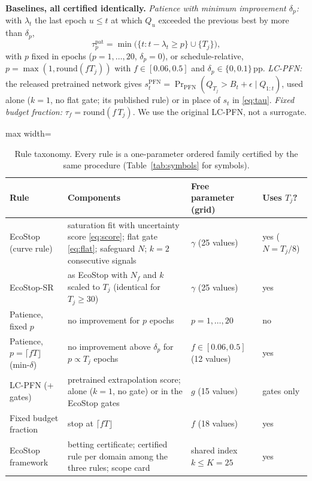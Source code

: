 \documentclass[3p,twocolumn,10pt]{elsarticle}
\theoremstyle{definition}
\begin{document}
\textbf{Baselines, all certified identically.} \emph{Patience with minimum improvement $\delta_p$:} with $\lambda_t$ the last epoch $u\le t$ at which $Q_u$ exceeded the previous best by more than $\delta_p$,
\begin{equation}
\tau^{\mathrm{pat}}_{p}=\min\big(\{t: t-\lambda_t\ge p\}\cup\{T_j\}\big),
\label{eq:pat}
\end{equation}
with $p$ fixed in epochs ($p=1,\dots,20$, $\delta_p=0$), or schedule-relative, $p=\max(1,\mathrm{round}(fT_j))$ with $f\in[0.06,0.5]$ and $\delta_p\in\{0,0.1\}$\,pp. \emph{LC-PFN:} the released pretrained network \citep{adriaensen2023lcpfn} gives $s^{\mathrm{PFN}}_t=\Pr_{\mathrm{PFN}}(Q_{T_j}>B_t+\epsilon\mid Q_{1:t})$, used alone ($k=1$, no flat gate; its published rule) or in place of $s_t$ in \eqref{eq:tau}. \emph{Fixed budget fraction:} $\tau_f=\mathrm{round}(f\,T_j)$. We use the original LC-PFN, not a surrogate.


\begin{table}[t]
\centering
\caption{Rule taxonomy. Every rule is a one-parameter ordered family certified by the same procedure (Table~\ref{tab:symbols} for symbols).}
\label{tab:taxonomy}
\footnotesize
\begin{adjustbox}{max width=\textwidth}
\begin{tabular}{p{3.3cm}p{6.2cm}p{3.0cm}p{2.3cm}}
\toprule
Rule & Components & Free parameter (grid) & Uses $T_j$? \\
\midrule
EcoStop (curve rule) & saturation fit with uncertainty score \eqref{eq:score}; flat gate \eqref{eq:flat}; safeguard $N$; $k{=}2$ consecutive signals & $\gamma$ (25 values) & yes ($N=T_j/8$) \\
EcoStop-SR & as EcoStop with $N_f$ and $k$ scaled to $T_j$ (identical for $T_j\ge30$) & $\gamma$ (25 values) & yes \\
Patience, fixed $p$ & no improvement for $p$ epochs & $p=1,\dots,20$ & no \\
Patience, $p=\lceil fT\rfloor$ (min-$\delta$) & no improvement above $\delta_p$ for $p\propto T_j$ epochs & $f\in[0.06,0.5]$ (12 values) & yes \\
LC-PFN (+ gates) & pretrained extrapolation score; alone ($k{=}1$, no gate) or in the EcoStop gates & $g$ (15 values) & gates only \\
Fixed budget fraction & stop at $\lceil fT\rfloor$ & $f$ (18 values) & yes \\
EcoStop framework & betting certificate; certified rule per domain among the three rules; scope card & shared index $k\le K{=}25$ & yes \\
\bottomrule
\end{tabular}
\end{adjustbox}
\end{table}
\end{document}
